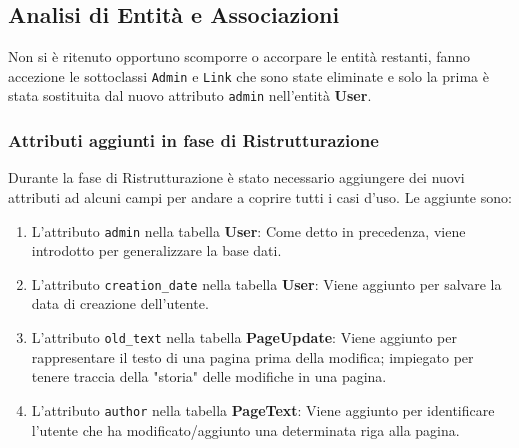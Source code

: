 \documentclass{article}
\begin{document}
	\subsection{Analisi di Entità e Associazioni}
	Non si è ritenuto opportuno scomporre o accorpare le entità restanti, fanno accezione le sottoclassi \texttt{Admin} e \texttt{Link} che sono state eliminate e solo la prima è stata sostituita dal nuovo attributo \texttt{admin} nell'entità \textbf{User}.
	\\
	
	\subsubsection{Attributi aggiunti in fase di Ristrutturazione}
	Durante la fase di Ristrutturazione è stato necessario aggiungere dei nuovi attributi ad alcuni campi per andare a coprire tutti i casi d'uso. Le aggiunte sono:
	
	\begin{enumerate}
		\item L'attributo \texttt{admin} nella tabella \textbf{User}: Come detto in precedenza, viene introdotto per generalizzare la base dati.
		\item L'attributo \texttt{creation\_date} nella tabella \textbf{User}: Viene aggiunto per salvare la data di creazione dell'utente.
		\item L'attributo \texttt{old\_text} nella tabella \textbf{PageUpdate}: Viene aggiunto per rappresentare il testo di una pagina prima della modifica; impiegato per tenere traccia della "storia" delle modifiche in una pagina.
		\item L'attributo \texttt{author} nella tabella \textbf{PageText}: Viene aggiunto per identificare l'utente che ha modificato/aggiunto una determinata riga alla pagina.
		\\\\
	\end{enumerate}
	 
	
\end{document}
